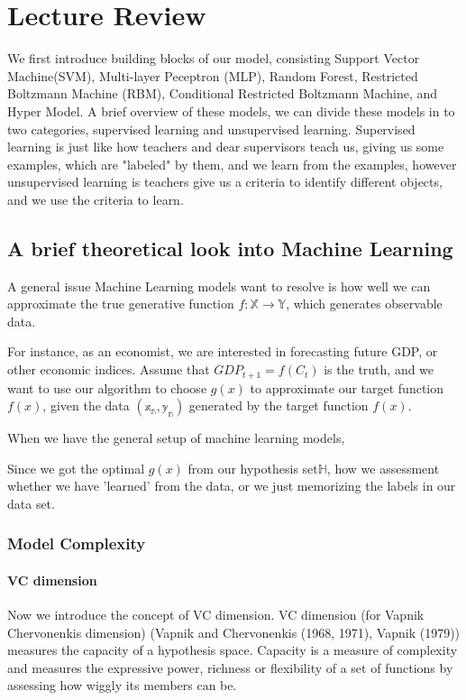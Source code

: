 \chapter{Lecture Review}

    We first introduce building blocks of our model, consisting Support Vector Machine(SVM), Multi-layer Peceptron
(MLP), Random Forest, Restricted Boltzmann Machine (RBM), Conditional Restricted Boltzmann Machine, and Hyper Model. A brief overview of these models, we can divide these models in to two categories, supervised learning and unsupervised learning. Supervised learning is just like how teachers and dear supervisors teach us, giving us some examples, which are "labeled" by them, and we learn from the examples, however unsupervised learning is teachers give us a criteria to identify different objects, and we use the criteria to learn.



\section{A brief theoretical look into Machine Learning}
    A general issue Machine Learning models want to resolve is how well we can approximate the true generative function $f:\mathbb{X}\rightarrow\mathbb{Y} $, which generates observable data.
   
    For instance, as an economist, we are interested in forecasting future GDP, or other economic indices. Assume that $GDP_{t+1} =f(C_{t})$ is the truth, and we want to use our algorithm to choose $g(x)$ to approximate our target function $f(x)$, given the data $(\mathbb{x_{n}},\mathbb{y_{n}}) $ generated by the target function $f(x)$.%

When we have the general setup of machine learning models, %


Since we got the optimal $g(x)$ from our hypothesis set$\mathbb{H}$, how we assessment whether we have 'learned' from the data, or we just memorizing the labels in our data set.%

\clearpage
\subsection*{Model Complexity}
\subsubsection*{VC dimension}
Now we introduce the concept of VC dimension.
VC dimension (for Vapnik Chervonenkis dimension) (Vapnik and Chervonenkis (1968, 1971), Vapnik (1979)) measures the capacity of a hypothesis space. Capacity is a measure of complexity and measures the expressive power, richness or flexibility of a set of functions by assessing how wiggly its members can be.


